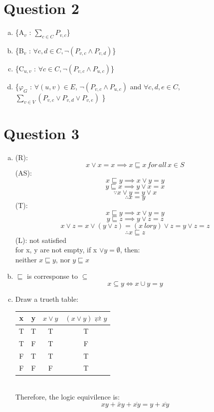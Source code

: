 \documentclass[11pt, a4paper]{article}
\begin{document}
\section*{Question 2}
\begin{enumerate}[(a)]
    \item
    \{A$_v$ :  $ \sum_{c \in C} P_{v, c}$\}
    \item
    \{B$_v$ :  $ \forall c,d \in C, \neg (P_{v, c} \land P_{v, d})$\}
    \item
    \{C$_{u, v}$ :  $ \forall c \in C, \neg (P_{v, c} \land P_{u, c})$\}
    \item
    \{$\varphi_G$ :  $ \forall (u,v) \in E $, $\neg (P_{v, c} \land P_{u, c})$ and $ \forall c,d,e \in C$, $\sum_{v \in V}(P_{v, c} \lor P_{v, d} \lor P_{v, e})$ \}
\end{enumerate}

\section*{Question 3}
\begin{enumerate}[(a)]
    \item
    (R):
    $$ x \lor x = x \implies x \sqsubseteq x \,  for\, all\, x \in S $$
    (AS):
    $$ x \sqsubseteq y \implies x \lor y = y $$
    $$ y \sqsubseteq x \implies y \lor x = x $$
    $$ \because x \lor y =y \lor x$$
    $$ \therefore x =y $$
    (T):
    $$ x \sqsubseteq y \implies x \lor y = y $$
    $$ y \sqsubseteq z \implies y \lor z = z $$
    $$ x \lor z = x \lor (y \lor z) = (x \ lor y) \lor z = y \lor z = z $$
    $$ \therefore x \sqsubseteq z $$
    (L): not satisfied\\
    for x, y are not empty, if x $\lor y = \emptyset $, then:\\
    neither $x \sqsubseteq y$, nor $ y \sqsubseteq x $
    \item
    $ \sqsubseteq $ is corresponse to $ \subseteq $
    $$ x \subseteq y \iff x \cup y = y $$
    \item
    Draw a trueth table:\\
    \begin{tabular}{ | c | c | c | c |}
        \hline
        x & y & $x \lor y$ & $ (x \lor y ) \rightleftarrows y$\\
        \hline
        T & T & T & T\\
        \hline
        T & F & T & F\\
        \hline
        F & T & T & T\\
        \hline
        F & F & F & T\\
        \hline
        \end{tabular}\\
        Therefore, the logic equivilence is:
        $$ xy + \bar{x}y + \overline{xy} = y + \overline{xy}$$
\end{enumerate}
\end{document}
